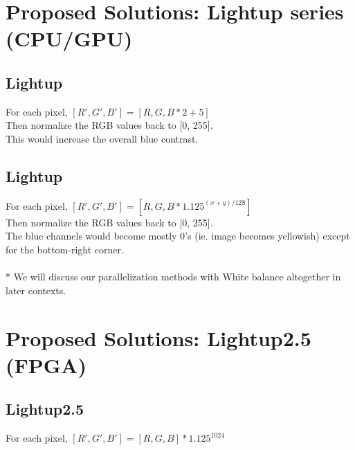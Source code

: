 \documentclass{acm_proc_article-sp}
\begin{document}
\section{Proposed Solutions: Lightup series (CPU/GPU)}
\subsection{Lightup}
For each pixel, \([R', G', B'] = [R, G, B * 2 + 5] \) \\
Then normalize the RGB values back to [0, 255]. \\
This would increase the overall blue contrast.
\subsection{Lightup}
For each pixel, \([R', G', B'] = [R, G, B * 1.125^{(x + y) / 128}]\) \\
Then normalize the RGB values back to [0, 255]. \\
The blue channels would become mostly 0's (ie. image becomes yellowish) except for the bottom-right corner. \\
\\
* We will discuss our parallelization methods with White balance altogether in later contexts.

\section{Proposed Solutions: Lightup2.5 (FPGA)}
\subsection{Lightup2.5}
For each pixel, \([R', G', B'] = [R, G, B] * 1.125^{1024}\)
\end{document}
